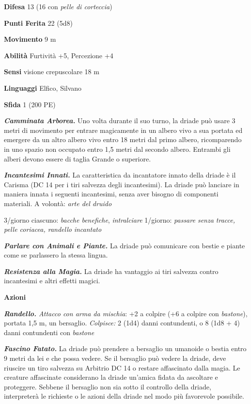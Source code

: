 \begin{multicols}{2}
\textbf{Difesa} 13 (16 con \emph{pelle di corteccia})

\textbf{Punti Ferita} 22 (5d8)

\textbf{Movimento} 9 m

\textbf{Abilità} Furtività +5, Percezione +4

\textbf{Sensi} visione crepuscolare 18 m

\textbf{Linguaggi} Elfico, Silvano

\textbf{Sfida} 1 (200 PE)

\emph{\textbf{Camminata Arborea.}} Uno volta durante il suo turno, la
driade può usare 3 metri di movimento per entrare magicamente in un
albero vivo a sua portata ed emergere da un altro albero vivo entro 18
metri dal primo albero, ricomparendo in uno spazio non occupato entro
1,5 metri dal secondo albero. Entrambi gli alberi devono essere di
taglia Grande o superiore.

\emph{\textbf{Incantesimi Innati.}} La caratteristica da incantatore
innato della driade è il Carisma (DC 14 per i tiri salvezza degli
incantesimi). La driade può lanciare in maniera innata i seguenti
incantesimi, senza aver bisogno di componenti materiali. A volontà:
\emph{arte del druido}

3/giorno ciascuno: \emph{bacche benefiche}, \emph{intralciare} 1/giorno:
\emph{passare senza tracce, pelle coriacea, randello} \emph{incantato}

\emph{\textbf{Parlare con Animali e Piante.}} La driade può comunicare
con bestie e piante come se parlassero la stessa lingua.

\emph{\textbf{Resistenza alla Magia.}} La driade ha vantaggio ai tiri
salvezza contro incantesimi e altri effetti magici.

\textbf{Azioni}

\emph{\textbf{Randello.} Attacco con arma da mischia}: +2 a colpire (+6
a colpire con \emph{bastone}), portata 1,5 m, un bersaglio.
\emph{Colpisce:} 2 (1d4) danni contundenti, o 8 (1d8 + 4) danni
contundenti con \emph{bastone}

\emph{\textbf{Fascino Fatato.}} La driade può prendere a bersaglio un
umanoide o bestia entro 9 metri da lei e che possa vedere. Se il
bersaglio può vedere la driade, deve riuscire un tiro salvezza su Arbitrio DC 14 o restare affascinato dalla magia. Le creature
affascinate considerano la driade un'amica fidata da ascoltare e
proteggere. Sebbene il bersaglio non sia sotto il controllo della
driade, interpreterà le richieste o le azioni della driade nel modo più
favorevole possibile.


\end{multicols}
